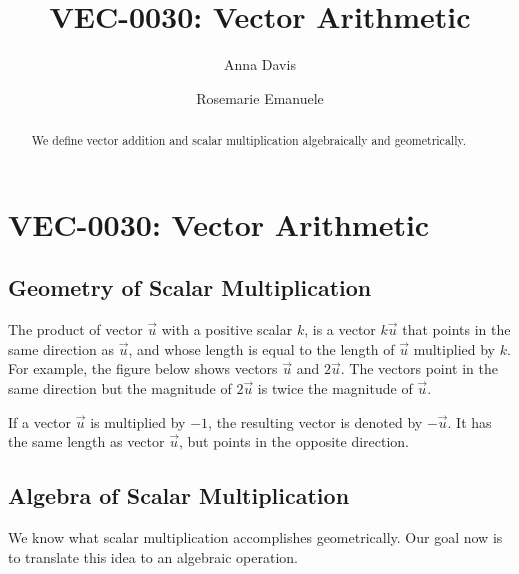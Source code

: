\documentclass{ximera}
\author{Anna Davis \and Rosemarie Emanuele} \title{VEC-0030:  Vector Arithmetic} \license{CC-BY 4.0}
\begin{document}
\begin{abstract}
 We define vector addition and scalar multiplication algebraically and geometrically.
\end{abstract}
\maketitle

\section*{VEC-0030:  Vector Arithmetic}

\subsection*{Geometry of Scalar Multiplication} The product of vector $\vec{u}$ with a positive scalar $k$, is a vector $k\vec{u}$ that points in the same direction as $\vec{u}$, and whose length  is equal to the length of $\vec{u}$ multiplied by $k$. For example, the figure below shows vectors $\vec{u}$ and $2\vec{u}$.  The vectors point in the same direction but the magnitude of $2\vec{u}$ is twice the magnitude of $\vec{u}$.

\begin{image}[1.5in]
\end{image}


If a vector $\vec{u}$ is multiplied by $-1$, the resulting vector is denoted by $-\vec{u}$.  It has the same length as vector $\vec{u}$, but points in the opposite direction.

\begin{image}[0.8in]
\end{image}



\subsection*{Algebra of Scalar Multiplication}
We know what scalar multiplication accomplishes geometrically.  Our goal now is to translate this idea to an algebraic operation.  
\end{document}

